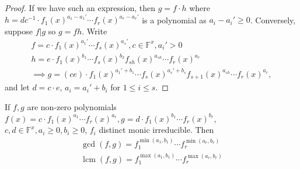 \documentclass[12pt,oneside]{article}
\DeclareMathOperator*{\lcm}{lcm}
\begin{document}
\begin{proof}
  If we have such an expression, then $g = f \cdot h$ where $h = d c ^{-1} \cdot f_1(x)^{a_1 - a_1'} \cdots f_r(x)^{a_r - a_r'}$ is a polynomial as $a_i - a_i' \geq 0$. Conversely, suppose $f | g$ so $g = fh$. Write \begin{align*}
    f = c \cdot f_1(x)^{a_1'} \cdots f_s(x)^{a_s'}, c \in \mathbb{F}^{x}, a_i' > 0\\
    h = e \cdot f_1(x)^{b_1} \cdots f_s(x)^{b_2} f_{sh}(x)^{a_{sh}} \cdots f_r(x)^{a_r}\\
    \implies g = (ce) \cdot f_1(x)^{a_1'+b_1} \cdots f_s(x)^{a_s'+b_s} f_{s+1}(x)^{a_{sh}} \cdots f_r(x)^{a_r},
  \end{align*}
  and let $d = c \cdot e$, $a_i = a_i' + b_i$ for $1 \leq i \leq s$.
\end{proof}
\begin{corollary}
  If $f,g$ are non-zero polynomials $f(x) = c \cdot f_1(x)^{a_1} \cdots f_r(x)^{a_r}, g = d \cdot f_1(x)^{b_1} \cdots f_r(x)^{b_r}$, $c,d \in \mathbb{F}^{x}, a_i \geq 0, b_i \geq 0$, $f_i$ distinct monic irreducible. Then \begin{align*}
    \gcd (f,g) = f_1^{\min (a_1, b_1)} \cdots f_r^{\min (a_r, b_r)}\\
    \lcm (f,g) = f_1^{\max (a_1, b_1)} \cdots f_r^{\max (a_r, b_r)}
  \end{align*}
\end{corollary}
\end{document}
